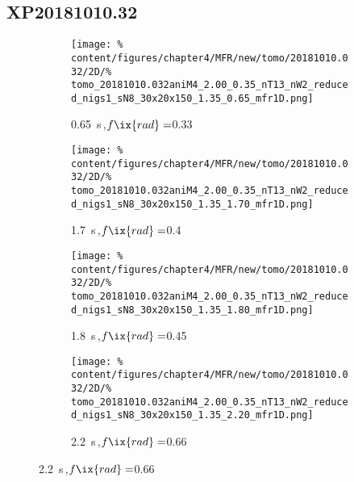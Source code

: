         \subsection*{XP20181010.32}%
%
            \begin{figure}[t]%
                \centering%
                \begin{subfigure}{0.45\textwidth}%
                    \centering%
                    \caption{\SI{0.65}{\second}\,,$f\ix{rad}=$\SI{0.33}{\arbitraryunit}}%
                    \texttt{[image: \%
                        content/figures/chapter4/MFR/new/tomo/20181010.032/2D/\%
                        tomo\_20181010.032aniM4\_2.00\_0.35\_nT13\_nW2\_reduced\_nigs1\_sN8\_30x20x150\_1.35\_0.65\_mfr1D.png]}%
                    \end{subfigure}%
                \hfill%
                \begin{subfigure}{0.45\textwidth}%
                    \centering%
                    \caption{\SI{1.7}{\second}\,,$f\ix{rad}=$\SI{0.4}{\arbitraryunit}}%
                    \texttt{[image: \%
                        content/figures/chapter4/MFR/new/tomo/20181010.032/2D/\%
                        tomo\_20181010.032aniM4\_2.00\_0.35\_nT13\_nW2\_reduced\_nigs1\_sN8\_30x20x150\_1.35\_1.70\_mfr1D.png]}%
                \end{subfigure}%
                \newline%
                \begin{subfigure}{0.45\textwidth}%
                    \centering%
                    \caption{\SI{1.8}{\second}\,,$f\ix{rad}=$\SI{0.45}{\arbitraryunit}}%
                    \texttt{[image: \%
                        content/figures/chapter4/MFR/new/tomo/20181010.032/2D/\%
                        tomo\_20181010.032aniM4\_2.00\_0.35\_nT13\_nW2\_reduced\_nigs1\_sN8\_30x20x150\_1.35\_1.80\_mfr1D.png]}%
                    \end{subfigure}%
                \hfill%
                \begin{subfigure}{0.45\textwidth}%
                    \centering%
                    \caption{\SI{2.2}{\second}\,,$f\ix{rad}=$\SI{0.66}{\arbitraryunit}}%
                    \texttt{[image: \%
                        content/figures/chapter4/MFR/new/tomo/20181010.032/2D/\%
                        tomo\_20181010.032aniM4\_2.00\_0.35\_nT13\_nW2\_reduced\_nigs1\_sN8\_30x20x150\_1.35\_2.20\_mfr1D.png]}%
                \end{subfigure}%
                \newline%

\end{figure}
